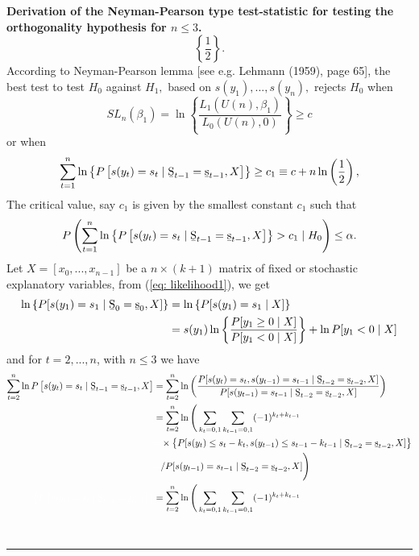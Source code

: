\documentclass[harvard,11pt]{article}
\newenvironment{proof}[1][Proof]{\textbf{#1.} }{\  \rule{0.5em}{0.5em}}
\begin{document}
\begin{proof}[Derivation of the Neyman-Pearson type test-statistic for testing the orthogonality hypothesis for $n\leq 3$]
\begin{equation*}
\left\{ \frac{1}{2}\right\} .
\end{equation*}%
According to Neyman-Pearson lemma [see e.g. Lehmann (1959), page 65], the
best test to test $H_{0}$ against $H_1,$ based on $s(y_{1}),...,s(y_{n}),$
rejects $H_{0}$ when%
\begin{equation*}
SL_n(\beta_1)=\ln \left\{ \frac{L_1\left( U(n),\beta _{1}\right) }{L_{0}\left( U(n),0\right) }\right\} \geq c
\end{equation*}%
or when%
\begin{equation*}
\sum\limits_{t=1}^{n}\ln \left\{ P\left[ s(y_{t})=s_{t}\mid \text{%
\b{S}}_{t-1}=\text{%
\b{s}}_{t-1},X\right] \right\} \geq c_1\equiv c+n\ln\left(\frac{1}{2}\right),
\end{equation*}%
The critical value, say $c_1$ is given by the smallest constant $c_1$ such that%
\begin{equation*}
P\left(\sum\limits_{t=1}^{n}\ln \left\{ P\left[ s(y_{t})=s_{t}\mid \text{%
\b{S}}_{t-1}=\text{%
\b{s}}_{t-1},X\right] \right\} >c_1\mid
H_{0}\right) \leq \alpha .
\end{equation*}
Let $X=[x_0,...,x_{n-1}]$ be a $n\times (k+1)$ matrix of fixed or stochastic explanatory variables, from (\ref{eq: likelihood1}), we get
\begingroup
\allowdisplaybreaks
\begin{align*}
\ln\left\{P[s(y_1)=s_1\mid \text{\b{S}}_{0}=\text{\b{s}}_{0},X]\right\}&=\ln\left\{P[s(y_1)=s_1\mid X]\right\}\\
&=s(y_1)\ln \left\{\frac{P[y_1\geq 0\mid X]}{P[y_1< 0\mid X]}\right\}+ \ln P[y_1< 0\mid X]
\end{align*}
\endgroup
and for $t=2,...,n$, with $n\leq3$ we have
\begingroup
\allowdisplaybreaks
\begin{align*}
 \sum\limits_{t=2}^{n} \ln P\left[s(y_{t})=s_{t}\mid \text{\b{S}}_{t-1}=\text{\b{s}}_{t-1},X\right] &=\sum\limits_{t=2}^{n}\ln\left(\frac{P[s(y_t)=s_t,s(y_{t-1})=s_{t-1}\mid \text{\b{S}}%
_{t-2}=\text{\b{s}}%
_{t-2},X]}{P[s(y_{t-1})=s_{t-1}\mid \text{\b{S}}%
_{t-2}=\text{\b{s}}%
_{t-2},X]}\right)\\
&=\sum\limits_{t=2}^{n}\ln\Bigg(\sum\limits_{k_t=0,1}\sum\limits_{k_{t-1}=0,1}(-1)^{k_t+k_{t-1}}\\
&\textcolor{white}{=}\times\left\{P[s(y_t)\leq s_t-k_t,s(y_{t-1})\leq s_{t-1}-k_{t-1}\mid \text{\b{S}}%
_{t-2}=\text{\b{s}}_{t-2},X]\right\}\\
&\textcolor{white}{=}/P[s(y_{t-1})=s_{t-1}\mid \text{\b{S}}_{t-2}=\text{\b{s}}_{t-2},X]\Bigg)\\
\textcolor{white}{\left\{ P\left[s(y_{t})=s_{t}\mid \text{\b{S}}_{t-1}=\text{\b{s}}_{t-1}\right] \right\} }&=\sum\limits_{t=2}^{n}\ln\Bigg(\sum\limits_{k_t=0,1}\sum\limits_{k_{t-1}=0,1}(-1)^{k_t+k_{t-1}}\\

\end{align*}
\end{proof}
\end{document}
